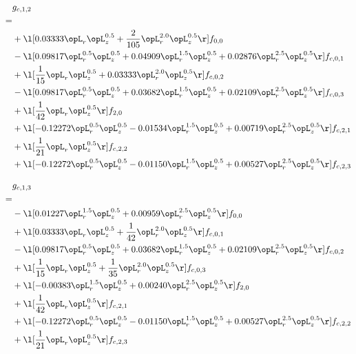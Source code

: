 \begin{alignat}{2} 
\label{eq:g_12_0} 
& g_{c,1,2} \nonumber \\ 
 = \\ 
& + \l[  0.03333 \opL_r \opL_z^{0.5} + \frac{2}{105} \opL_r^{2.0} \opL_z^{0.5}  \r] f_{0,0} \nonumber \\ 
& - \l[  0.09817 \opL_r^{0.5} \opL_z^{0.5} +  0.04909 \opL_r^{1.5} \opL_z^{0.5} +  0.02876 \opL_r^{2.5} \opL_z^{0.5}  \r] f_{c,0,1} \nonumber \\ 
& + \l[ \frac{1}{15} \opL_r \opL_z^{0.5} +  0.03333 \opL_r^{2.0} \opL_z^{0.5}  \r] f_{c,0,2} \nonumber \\ 
& - \l[  0.09817 \opL_r^{0.5} \opL_z^{0.5} +  0.03682 \opL_r^{1.5} \opL_z^{0.5} +  0.02109 \opL_r^{2.5} \opL_z^{0.5}  \r] f_{c,0,3} \nonumber \\ 
& + \l[ \frac{1}{42} \opL_r \opL_z^{0.5}  \r] f_{2,0} \nonumber \\ 
& + \l[  -0.12272 \opL_r^{0.5} \opL_z^{0.5}   -0.01534 \opL_r^{1.5} \opL_z^{0.5} +  0.00719 \opL_r^{2.5} \opL_z^{0.5}  \r] f_{c,2,1} \nonumber \\ 
& + \l[ \frac{1}{21} \opL_r \opL_z^{0.5}  \r] f_{c,2,2} \nonumber \\ 
& + \l[  -0.12272 \opL_r^{0.5} \opL_z^{0.5}   -0.01150 \opL_r^{1.5} \opL_z^{0.5} +  0.00527 \opL_r^{2.5} \opL_z^{0.5}  \r] f_{c,2,3} \nonumber \\ 
\end{alignat} 


\begin{alignat}{2} 
\label{eq:g_13_0} 
& g_{c,1,3} \nonumber \\ 
 = \\ 
& - \l[  0.01227 \opL_r^{1.5} \opL_z^{0.5} +  0.00959 \opL_r^{2.5} \opL_z^{0.5}  \r] f_{0,0} \nonumber \\ 
& + \l[  0.03333 \opL_r \opL_z^{0.5} + \frac{1}{42} \opL_r^{2.0} \opL_z^{0.5}  \r] f_{c,0,1} \nonumber \\ 
& - \l[  0.09817 \opL_r^{0.5} \opL_z^{0.5} +  0.03682 \opL_r^{1.5} \opL_z^{0.5} +  0.02109 \opL_r^{2.5} \opL_z^{0.5}  \r] f_{c,0,2} \nonumber \\ 
& + \l[ \frac{1}{15} \opL_r \opL_z^{0.5} + \frac{1}{35} \opL_r^{2.0} \opL_z^{0.5}  \r] f_{c,0,3} \nonumber \\ 
& + \l[  -0.00383 \opL_r^{1.5} \opL_z^{0.5} +  0.00240 \opL_r^{2.5} \opL_z^{0.5}  \r] f_{2,0} \nonumber \\ 
& + \l[ \frac{1}{42} \opL_r \opL_z^{0.5}  \r] f_{c,2,1} \nonumber \\ 
& + \l[  -0.12272 \opL_r^{0.5} \opL_z^{0.5}   -0.01150 \opL_r^{1.5} \opL_z^{0.5} +  0.00527 \opL_r^{2.5} \opL_z^{0.5}  \r] f_{c,2,2} \nonumber \\ 
& + \l[ \frac{1}{21} \opL_r \opL_z^{0.5}  \r] f_{c,2,3} \nonumber \\ 
\end{alignat} 


